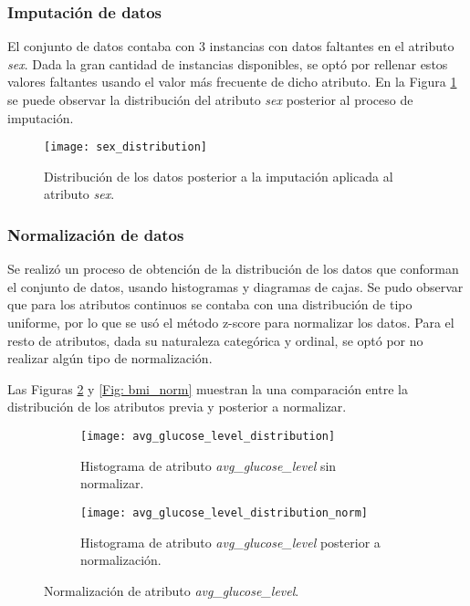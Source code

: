 \subsubsection{Imputación de datos}
El conjunto de datos contaba con 3 instancias con datos faltantes en el atributo \emph{sex}. Dada la gran cantidad de instancias disponibles, se optó por rellenar estos valores faltantes usando el valor más frecuente de dicho atributo. En la Figura \ref{Fig: Imputation} se puede observar la distribución del atributo \emph{sex} posterior al proceso de imputación.

\begin{figure}[htbp]
	\centering
	\texttt{[image: sex\_distribution]}
	\caption{Distribución de los datos posterior a la imputación aplicada al atributo \emph{sex}.}
	\label{Fig: Imputation}
\end{figure}

\subsubsection{Normalización de datos}
Se realizó un proceso de obtención de la distribución de los datos que conforman el conjunto de datos, usando histogramas y diagramas de cajas. Se pudo observar que para los atributos continuos se contaba con una distribución de tipo uniforme, por lo que se usó el método z-score para normalizar los datos. Para el resto de atributos, dada su naturaleza categórica y ordinal, se optó por no realizar algún tipo de normalización.

Las Figuras \ref{Fig: glucose_norm} y \ref{Fig: bmi_norm} muestran la una comparación entre la distribución de los atributos previa y posterior a normalizar.

\begin{figure}[!htb]
	\centering
	\begin{subfigure}[b]{0.85\textwidth}
		\centering
		\texttt{[image: avg\_glucose\_level\_distribution]}
		\caption{Histograma de atributo \emph{avg\_glucose\_level} sin normalizar.}
	\end{subfigure}
	\hfill
	\begin{subfigure}[b]{0.85\textwidth}
		\centering
		\texttt{[image: avg\_glucose\_level\_distribution\_norm]}
		\caption{Histograma de atributo \emph{avg\_glucose\_level} posterior a normalización.}
	\end{subfigure}
	\caption{Normalización de atributo \emph{avg\_glucose\_level}.}
	\label{Fig: glucose_norm}
\end{figure}

